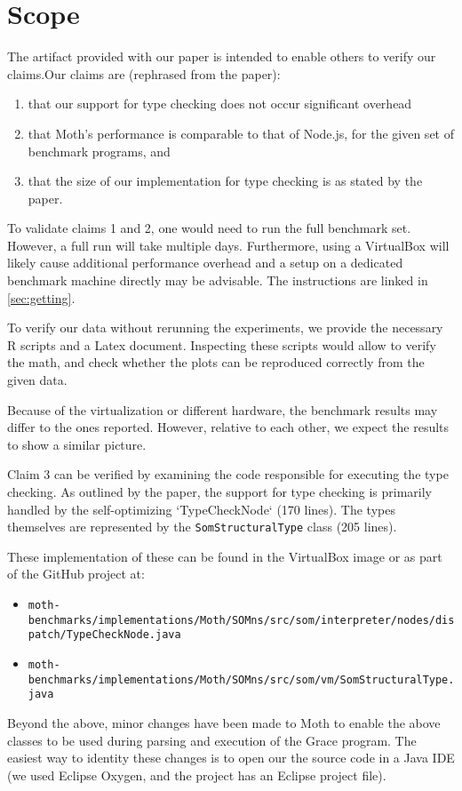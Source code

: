 \documentclass[a4paper,USenglish]{darts-v2019}
\newenvironment{scope}{\section{Scope}}{}
\begin{document}
\begin{scope}

The artifact provided with our paper is intended to enable others
to verify our claims.Our claims are (rephrased from the paper):

\begin{enumerate}
  \item that our support for type checking does not occur significant overhead
  \item that Moth's performance is comparable to that of Node.js, for the given set of benchmark programs, and
  \item that the size of our implementation for type checking is as stated by the paper.

\end{enumerate}

To validate claims 1 and 2, one would need to run the full benchmark set.
However, a full run will take multiple days.
Furthermore, using a VirtualBox will likely cause additional performance overhead
and a setup on a dedicated benchmark machine directly may be advisable.
The instructions are linked in \cref{sec:getting}.

To verify our data without rerunning the experiments,
we provide the necessary R scripts and a Latex document.
Inspecting these scripts would allow to verify the math,
and check whether the plots can be reproduced correctly from the given data.


Because of the virtualization or different hardware,
the benchmark results may differ to the ones reported.
However, relative to each other, we expect the results to show a similar picture.

Claim 3 can be verified by examining the code responsible
for executing the type checking.
As outlined by the paper, the support for type checking is primarily
handled by the self-optimizing `TypeCheckNode` (170 lines).
The types themselves are represented by the
\texttt{SomStructuralType} class (205 lines).

These implementation of these can be found in the VirtualBox image
or as part of the GitHub project at:

\begin{itemize}
  \item \texttt{moth-benchmarks/implementations/Moth/SOMns/src/som/interpreter/nodes/dispatch/TypeCheckNode.java}
  \item \texttt{moth-benchmarks/implementations/Moth/SOMns/src/som/vm/SomStructuralType.java}
\end{itemize}

Beyond the above, minor changes have been made to Moth to enable the above
classes to be used during parsing and execution of the Grace program.
The easiest way to identity these changes is to open our the source code
in a Java IDE (we used Eclipse Oxygen, and the project has an Eclipse project file).


\end{scope}
\end{document}
